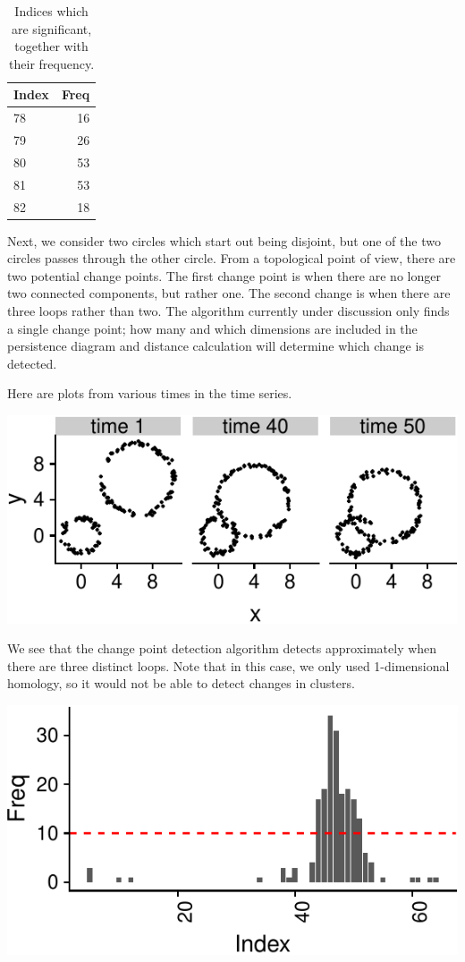 \documentclass[smallextended]{svjour3}       %
\begin{document}
\begin{longtable}[t]{lr}
\caption{\label{tab:unnamed-chunk-2}Indices which are significant, together with their frequency.}\\
\toprule
Index & Freq\\
\midrule
78 & 16\\
79 & 26\\
80 & 53\\
81 & 53\\
82 & 18\\
\bottomrule
\end{longtable}

Next, we consider two circles which start out being disjoint, but one of
the two circles passes through the other circle. From a topological
point of view, there are two potential change points. The first change
point is when there are no longer two connected components, but rather
one. The second change is when there are three loops rather than two.
The algorithm currently under discussion only finds a single change
point; how many and which dimensions are included in the persistence
diagram and distance calculation will determine which change is
detected.

Here are plots from various times in the time series.

\begin{center}\includegraphics{springer_template_files/figure-latex/chunk_7-1} \end{center}

We see that the change point detection algorithm detects approximately
when there are three distinct loops. Note that in this case, we only
used 1-dimensional homology, so it would not be able to detect changes
in clusters.

\begin{center}\includegraphics{springer_template_files/figure-latex/chunk_7_5-1} \end{center}
\end{document}
